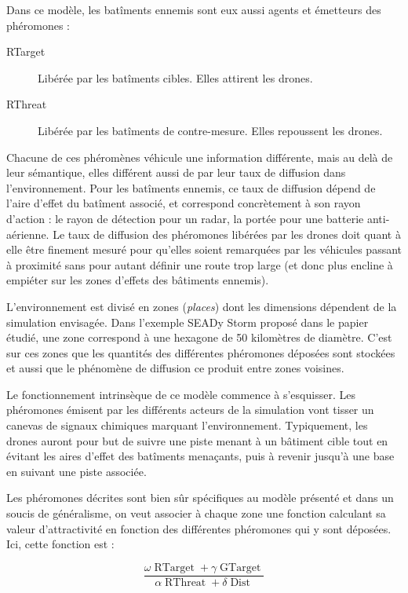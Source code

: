 \documentclass[12pt]{article}
\begin{document}
Dans ce modèle, les batîments ennemis sont eux aussi agents et émetteurs des phéromones :

\begin{description}
  \item[RTarget]{Libérée par les batîments cibles. Elles attirent les drones.}
  \item[RThreat]{Libérée par les batîments de contre-mesure. Elles repoussent les drones.}
\end{description}

Chacune de ces phéromènes véhicule une information différente, mais au delà de leur sémantique, elles
différent aussi de par leur taux de diffusion dans l'environnement.
Pour les batîments ennemis, ce taux de diffusion dépend de l'aire d'effet du batîment associé, 
et correspond concrètement à son rayon d'action : le rayon de détection pour un radar, la portée pour une batterie anti-aérienne.
Le taux de diffusion des phéromones libérées par les drones doit quant à elle être finement mesuré pour qu'elles soient remarquées par les véhicules passant à proximité
sans pour autant définir une route trop large (et donc plus encline à empiéter sur les zones d'effets des bâtiments ennemis).

L'environnement est divisé en zones (\textit{places}) dont les dimensions dépendent de la simulation envisagée. 
Dans l'exemple SEADy Storm proposé dans le papier étudié, une zone correspond à une hexagone de 50 kilomètres de diamètre.
C'est sur ces zones que les quantités des différentes phéromones déposées sont stockées et aussi que le 
phénomène de diffusion ce produit entre zones voisines.

Le fonctionnement intrinsèque de ce modèle commence à s'esquisser. Les phéromones émisent par les
différents acteurs de la simulation vont tisser un canevas de signaux chimiques marquant l'environnement.
Typiquement, les drones auront pour but de suivre une piste menant à un bâtiment cible tout en évitant 
les aires d'effet des batîments menaçants, puis à revenir jusqu'à une base en suivant une piste associée.

Les phéromones décrites sont bien sûr spécifiques au modèle présenté et dans un soucis
de généralisme, on veut associer à chaque zone une fonction calculant sa valeur d'attractivité
en fonction des différentes phéromones qui y sont déposées. Ici, cette fonction est :

$$
\frac{\omega \operatorname{RTarget} + \gamma \operatorname{GTarget}}{\alpha \operatorname{RThreat} + \delta \operatorname{Dist}}
$$
\end{document}
